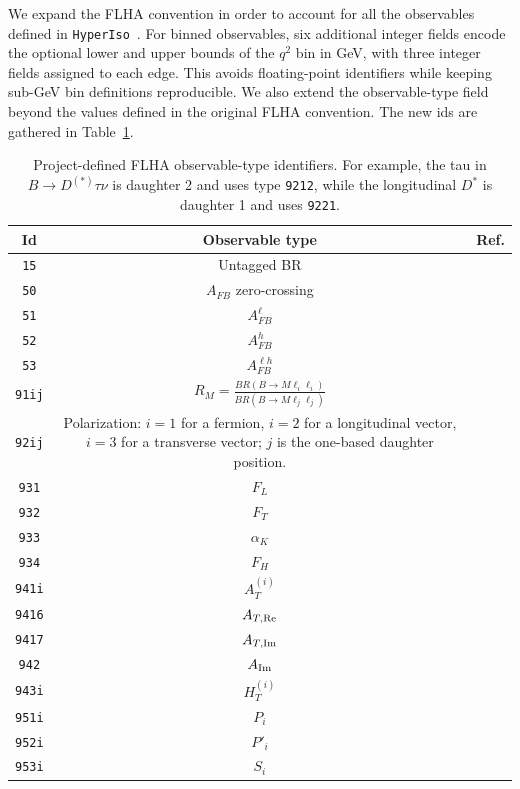 \documentclass[preprint,11pt]{elsarticle}
\newcommand{\hi}{\texttt{HyperIso}}
\begin{document}
We expand the FLHA convention \cite{Mahmoudi:2010iz} in order to account for all the observables defined in \hi~. For binned observables, six additional integer fields encode the optional lower and upper bounds of the $q^2$ bin in GeV, with three integer fields assigned to each edge. This avoids floating-point identifiers while keeping sub-GeV bin definitions reproducible. We also extend the observable-type field beyond the values defined in the original FLHA convention. The new ids are gathered in Table~\ref{tab:obs_ids}.

\begin{table}[!h]
    \centering
    \begin{tabular}{ccc}
        Id&Observable type&Ref.\\\hline\hline
        \texttt{15}&Untagged BR&\\
        \texttt{50}&$A_{FB}$ zero-crossing&\\
        \texttt{51}&$A_{FB}^\ell$&\\
        \texttt{52}&$A_{FB}^h$&\\
        \texttt{53}&$A_{FB}^{\ell h}$&\\
        \texttt{91ij}&$R_M=\frac{BR(B\to M\ell_i\ell_i)}{BR(B\to M\ell_j\ell_j)}$&\\
        \texttt{92ij}&Polarization: $i=1$ for a fermion, $i=2$ for a longitudinal vector, $i=3$ for a transverse vector; $j$ is the one-based daughter position.&\\
        \texttt{931}&$F_L$& \\
        \texttt{932}&$F_T$& \\
        \texttt{933}&$\alpha_K$& \\
        \texttt{934}&$F_H$& \\
        \texttt{941i}&$A_T^{(i)}$& \\
        \texttt{9416}&$A_{T,\rm Re}$& \\
        \texttt{9417}&$A_{T,\rm Im}$& \\
        \texttt{942}&$A_{\rm Im}$& \\
        \texttt{943i}&$H_T^{(i)}$& \\
        \texttt{951i}&$P_i$& \\
        \texttt{952i}&$P'_i$& \\
        \texttt{953i}&$S_i$& \\
    \end{tabular}
    \caption{Project-defined FLHA observable-type identifiers. For example, the tau in $B\to D^{(*)}\tau\nu$ is daughter 2 and uses type \texttt{9212}, while the longitudinal $D^*$ is daughter 1 and uses \texttt{9221}.}
    \label{tab:obs_ids}
\end{table}
\end{document}
